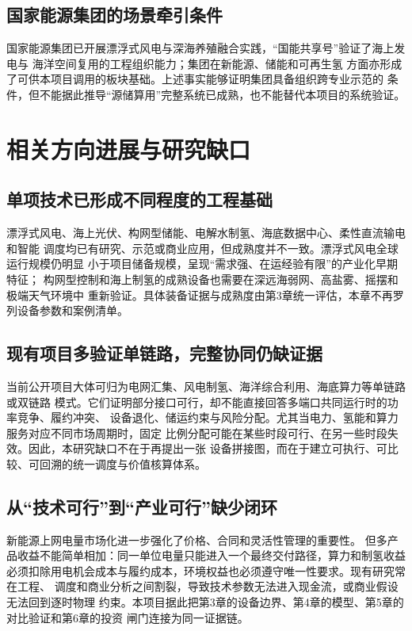 \subsection{国家能源集团的场景牵引条件}

国家能源集团已开展漂浮式风电与深海养殖融合实践，“国能共享号”验证了海上发电与
海洋空间复用的工程组织能力\cite{chnenergy-sharing}；集团在新能源、储能和可再生氢
方面亦形成了可供本项目调用的板块基础。上述事实能够证明集团具备组织跨专业示范的
条件，但不能据此推导“源储算用”完整系统已成熟，也不能替代本项目的系统验证。

\section{相关方向进展与研究缺口}

\subsection{单项技术已形成不同程度的工程基础}

漂浮式风电、海上光伏、构网型储能、电解水制氢、海底数据中心、柔性直流输电和智能
调度均已有研究、示范或商业应用，但成熟度并不一致。漂浮式风电全球运行规模仍明显
小于项目储备规模，呈现“需求强、在运经验有限”的产业化早期特征\cite{irena-floating}；
构网型控制和海上制氢的成熟设备也需要在深远海弱网、高盐雾、摇摆和极端天气环境中
重新验证。具体装备证据与成熟度由第3章统一评估，本章不再罗列设备参数和案例清单。

\subsection{现有项目多验证单链路，完整协同仍缺证据}

当前公开项目大体可归为电网汇集、风电制氢、海洋综合利用、海底算力等单链路或双链路
模式。它们证明部分接口可行，却不能直接回答多端口共同运行时的功率竞争、履约冲突、
设备退化、储运约束与风险分配。尤其当电力、氢能和算力服务对应不同市场周期时，固定
比例分配可能在某些时段可行、在另一些时段失效。因此，本研究缺口不在于再提出一张
设备拼接图，而在于建立可执行、可比较、可回溯的统一调度与价值核算体系。

\subsection{从“技术可行”到“产业可行”缺少闭环}

新能源上网电量市场化进一步强化了价格、合同和灵活性管理的重要性\cite{ndrc-price}。
但多产品收益不能简单相加：同一单位电量只能进入一个最终交付路径，算力和制氢收益
必须扣除用电机会成本与履约成本，环境权益也必须遵守唯一性要求。现有研究常在工程、
调度和商业分析之间割裂，导致技术参数无法进入现金流，或商业假设无法回到逐时物理
约束。本项目据此把第3章的设备边界、第4章的模型、第5章的对比验证和第6章的投资
闸门连接为同一证据链。


